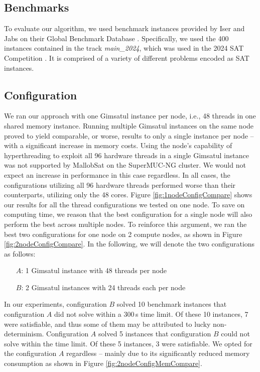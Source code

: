 \documentclass[12pt,a4paper,twoside]{scrartcl}
\numberwithin{equation}{section}
\begin{document}
\subsection{Benchmarks}
To evaluate our algorithm, we used benchmark instances provided by Iser and Jabs on their Global Benchmark Database \cite{benchmarkDB}. Specifically, we used the 400 instances contained in the track \textit{main\_2024}, which was used in the 2024 SAT Competition \cite{satComp2024}. It is comprised of a variety of different problems encoded as SAT instances.

\subsection{Configuration}
We ran our approach with one Gimsatul instance per node, i.e., 48 threads in one shared memory instance. Running multiple Gimsatul instances on the same node proved to yield comparable, or worse, results to only a single instance per node -- with a significant increase in memory costs. Using the node's capability of hyperthreading to exploit all 96 hardware threads in a single Gimsatul instance was not supported by MallobSat on the SuperMUC-NG cluster. We would not expect an increase in performance in this case regardless. In all cases, the configurations utilizing all 96 hardware threads performed worse than their counterparts, utilizing only the 48 cores. Figure \ref{fig:1nodeConfigCompare} shows our results for all the thread configurations we tested on one node. To save on computing time, we reason that the best configuration for a single node will also perform the best across multiple nodes. To reinforce this argument, we ran the best two configurations for one node on 2 compute nodes, as shown in Figure \ref{fig:2nodeConfigCompare}. In the following, we will denote the two configurations as follows:
\begin{itemize}
  \item[$A$:] 1 Gimsatul instance with 48 threads per node
  \item[$B$:] 2 Gimsatul instances with 24 threads each per node
\end{itemize}

In our experiments, configuration $B$ solved 10 benchmark instances that configuration $A$ did not solve within a $300\,$s time limit. Of these 10 instances, 7 were satisfiable, and thus some of them may be attributed to lucky non-determinism. Configuration $A$ solved 5 instances that configuration $B$ could not solve within the time limit. Of these 5 instances, 3 were satisfiable. We opted for the configuration $A$ regardless -- mainly due to its significantly reduced memory consumption as shown in Figure \ref{fig:2nodeConfigMemCompare}.
\end{document}
